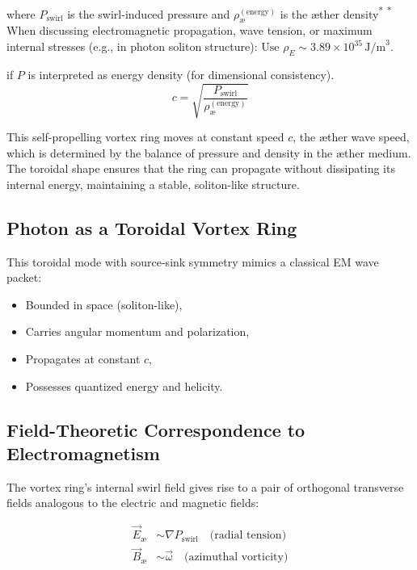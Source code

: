 \noindent
where $P_{\text{swirl}}$ is the swirl-induced pressure and $\rho_\text{\ae}^{(\text{energy})}$ is the æther density\textsuperscript{*}
\vspace{0.5em}
\noindent\textsuperscript{*}\small
When discussing electromagnetic propagation, wave tension, or maximum internal stresses (e.g., in photon soliton structure): $\text{Use } \rho_{\scriptscriptstyle\boldsymbol\!E}\sim 3.89 \times 10^{35} \, \text{J/m}^3$.


if $P$ is interpreted as energy density (for dimensional consistency).
\begin{equation}
    c = \sqrt{\frac{P_{\text{swirl}}}{\rho_\text{\ae}^{(\text{energy})}}}
\end{equation}

This self-propelling vortex ring moves at constant speed $c$, the æther wave speed, which is determined by the balance of pressure and density in the æther medium. The toroidal shape ensures that the ring can propagate without dissipating its internal energy, maintaining a stable, soliton-like structure.

\subsection{Photon as a Toroidal Vortex Ring}
This toroidal mode with source-sink symmetry mimics a classical EM wave packet:
\begin{itemize}
    \item Bounded in space (soliton-like),
    \item Carries angular momentum and polarization,
    \item Propagates at constant \( c \),
    \item Possesses quantized energy and helicity.
\end{itemize}


\subsection{Field-Theoretic Correspondence to Electromagnetism}

The vortex ring’s internal swirl field gives rise to a pair of orthogonal transverse fields analogous to the electric and magnetic fields:

\begin{align}
    \vec{E}_\text{æ} &\sim \nabla P_{\text{swirl}} \quad \text{(radial tension)} \\
    \vec{B}_\text{æ} &\sim \vec{\omega} \quad \text{(azimuthal vorticity)}
\end{align}

